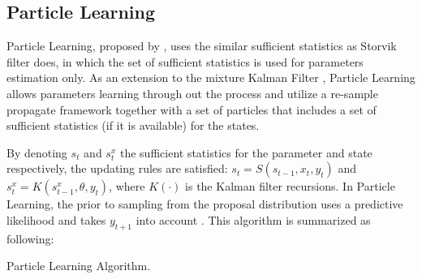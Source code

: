 \subsection{Particle Learning}

Particle Learning, proposed by \cite{carvalho2010particle}, uses the similar sufficient statistics as Storvik filter does, in which the set of sufficient statistics is used for parameters estimation only. As an extension to the mixture Kalman Filter \cite{chen2000mixture}, Particle Learning allows parameters learning through out the process and utilize a re-sample propagate framework together with a set of particles that includes a set of sufficient statistics (if it is available) for the states. 

By denoting $s_t$ and $s_t^x$ the sufficient statistics for the parameter and state respectively, the updating rules are satisfied: $s_t=S(s_{t-1},x_t,y_t)$ and $s_t^x=K(s_{t-1}^x,\theta,y_t)$, where $K(\cdot)$ is the Kalman filter recursions. In Particle Learning, the prior to sampling from the proposal distribution uses a predictive likelihood and takes $y_{t+1}$ into account \cite{vieira2016online}. This algorithm is summarized as following: 

\begin{algorithm}[h]
\SetAlgoLined 
\caption{Particle Learning Algorithm.}\label{algorithmPL}
\end{algorithm}

